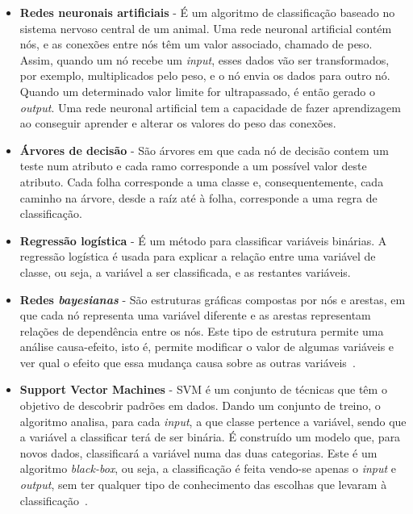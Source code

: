 \begin{itemize}
\item \textbf{Redes neuronais artificiais} - É um algoritmo de classificação baseado no sistema nervoso central de um animal. Uma rede neuronal artificial contém nós, e as conexões entre nós têm um valor associado, chamado de peso. Assim, quando um nó recebe um \textit{input}, esses dados vão ser transformados, por exemplo, multiplicados pelo peso, e o nó envia os dados para outro nó. Quando um determinado valor limite for ultrapassado, é então gerado o \textit{output}. Uma rede neuronal artificial tem a capacidade de fazer aprendizagem ao conseguir aprender e alterar os valores do peso das conexões.

\item \textbf{Árvores de decisão} - São árvores em que cada nó de decisão contem um teste num atributo e cada ramo corresponde a um possível valor deste atributo. Cada folha corresponde a uma classe e, consequentemente, cada caminho na árvore, desde a raíz até à folha, corresponde a uma regra de classificação. 

\item \textbf{Regressão logística} - É um método para classificar variáveis binárias. A regressão logística é usada para explicar a relação entre uma variável de classe, ou seja, a variável a ser classificada, e as restantes variáveis.\newline

\item \textbf{Redes \textit{bayesianas}} - São estruturas gráficas compostas por nós e arestas, em que cada nó representa uma variável diferente e as arestas representam relações de dependência entre os nós. Este tipo de estrutura permite uma análise causa-efeito, isto é, permite modificar o valor de algumas variáveis e ver qual o efeito que essa mudança causa sobre as outras variáveis~\cite{nets}.

\item \textbf{Support Vector Machines} - \ac{SVM} é um conjunto de técnicas que têm o objetivo de descobrir padrões em dados. Dando um conjunto de treino, o algoritmo analisa, para cada \textit{input}, a que classe pertence a variável, sendo que a variável a classificar terá de ser binária. É construído um modelo que, para novos dados, classificará a variável numa das duas categorias. Este é um algoritmo \textit{black-box}, ou seja, a classificação é feita vendo-se apenas o \textit{input} e \textit{output}, sem ter qualquer tipo de conhecimento das escolhas que levaram à classificação~\cite{svmm}.
\end{itemize}

